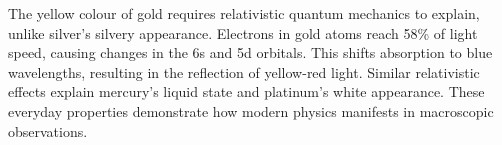 The yellow colour of gold requires relativistic quantum mechanics to explain, unlike silver's silvery appearance. Electrons in gold atoms reach 58\% of light speed, causing changes in the 6s and 5d orbitals. This shifts absorption to blue wavelengths, resulting in the reflection of yellow-red light. Similar relativistic effects explain mercury's liquid state and platinum's white appearance. These everyday properties demonstrate how modern physics manifests in macroscopic observations.
